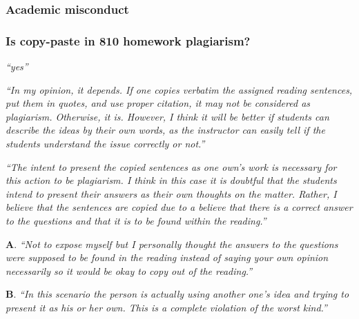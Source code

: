 \documentclass[12pt]{beamer}
\newcommand\ans[1]{{\it ``#1''}}
\newcommand\gap{\vspace{5mm}}
\begin{document}

\begin{frame}

\frametitle{
Academic misconduct
}

\end{frame}

\begin{frame} %

\frametitle{ Is copy-paste in 810 homework plagiarism?}

\ans{yes}


\gap

\ans{In  my  opinion,  it  depends.   If  one  copies  verbatim  the  assigned  reading sentences, put them in quotes, and use proper citation, it may not be considered as plagiarism.  Otherwise, it is.  However, I think it will be better if students can describe the ideas by their own words, as the instructor can easily tell if the students understand the issue correctly or not.}

\end{frame}

\begin{frame}
\ans{The intent to present the copied sentences as one own's work is necessary for this action to be plagiarism.  I think in this case it is doubtful that the students intend to present their answers as their own thoughts on the matter.  Rather, I believe that the sentences are copied due to a believe that there is a correct answer to the questions and that it is to be found within the reading.}
\end{frame}


\begin{frame}
{\bf A}. \ans{Not  to  expose  myself  but  I  personally  thought  the  answers  to  the questions were supposed to be found in the reading instead of saying your own opinion necessarily so it would be okay to copy out of the reading.}

\gap

{\bf B}. \ans{In  this  scenario  the  person  is  actually using another one's idea and trying to present it as his or her own.  This is a complete violation of the worst kind.}

\end{frame}
\end{document}
